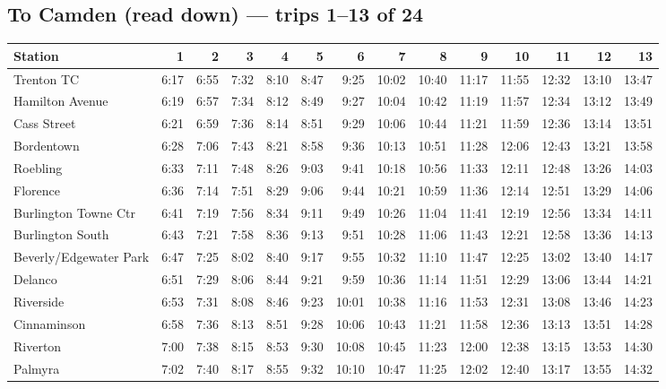 \subsection*{To Camden (read down) --- trips 1--13 of 24}
\begin{center}\footnotesize\setlength{\tabcolsep}{3pt}\begin{tabular}{@{}lrrrrrrrrrrrrr@{}}\toprule
Station & 1 & 2 & 3 & 4 & 5 & 6 & 7 & 8 & 9 & 10 & 11 & 12 & 13 \\\midrule
Trenton TC & 6:17 & 6:55 & 7:32 & 8:10 & 8:47 & 9:25 & 10:02 & 10:40 & 11:17 & 11:55 & 12:32 & 13:10 & 13:47 \\
Hamilton Avenue & 6:19 & 6:57 & 7:34 & 8:12 & 8:49 & 9:27 & 10:04 & 10:42 & 11:19 & 11:57 & 12:34 & 13:12 & 13:49 \\
Cass Street & 6:21 & 6:59 & 7:36 & 8:14 & 8:51 & 9:29 & 10:06 & 10:44 & 11:21 & 11:59 & 12:36 & 13:14 & 13:51 \\
Bordentown & 6:28 & 7:06 & 7:43 & 8:21 & 8:58 & 9:36 & 10:13 & 10:51 & 11:28 & 12:06 & 12:43 & 13:21 & 13:58 \\
Roebling & 6:33 & 7:11 & 7:48 & 8:26 & 9:03 & 9:41 & 10:18 & 10:56 & 11:33 & 12:11 & 12:48 & 13:26 & 14:03 \\
Florence & 6:36 & 7:14 & 7:51 & 8:29 & 9:06 & 9:44 & 10:21 & 10:59 & 11:36 & 12:14 & 12:51 & 13:29 & 14:06 \\
Burlington Towne Ctr & 6:41 & 7:19 & 7:56 & 8:34 & 9:11 & 9:49 & 10:26 & 11:04 & 11:41 & 12:19 & 12:56 & 13:34 & 14:11 \\
Burlington South & 6:43 & 7:21 & 7:58 & 8:36 & 9:13 & 9:51 & 10:28 & 11:06 & 11:43 & 12:21 & 12:58 & 13:36 & 14:13 \\
Beverly/Edgewater Park & 6:47 & 7:25 & 8:02 & 8:40 & 9:17 & 9:55 & 10:32 & 11:10 & 11:47 & 12:25 & 13:02 & 13:40 & 14:17 \\
Delanco & 6:51 & 7:29 & 8:06 & 8:44 & 9:21 & 9:59 & 10:36 & 11:14 & 11:51 & 12:29 & 13:06 & 13:44 & 14:21 \\
Riverside & 6:53 & 7:31 & 8:08 & 8:46 & 9:23 & 10:01 & 10:38 & 11:16 & 11:53 & 12:31 & 13:08 & 13:46 & 14:23 \\
Cinnaminson & 6:58 & 7:36 & 8:13 & 8:51 & 9:28 & 10:06 & 10:43 & 11:21 & 11:58 & 12:36 & 13:13 & 13:51 & 14:28 \\
Riverton & 7:00 & 7:38 & 8:15 & 8:53 & 9:30 & 10:08 & 10:45 & 11:23 & 12:00 & 12:38 & 13:15 & 13:53 & 14:30 \\
Palmyra & 7:02 & 7:40 & 8:17 & 8:55 & 9:32 & 10:10 & 10:47 & 11:25 & 12:02 & 12:40 & 13:17 & 13:55 & 14:32 \\

\end{tabular}
\end{center}
